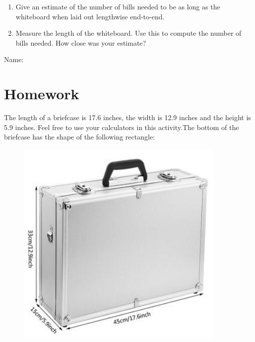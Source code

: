 \documentclass{article}
\begin{document}
\begin{enumerate}
  \vspace{1.5in}
  
\item Give an estimate of the number of bills needed to be as long as the whiteboard when laid out lengthwise end-to-end.

  \vspace{1.5in}
  
\item Measure the length of the whiteboard. Use this to compute the number of bills needed. How close was your estimate?
\end{enumerate}

\mynewpage

\hfill Name:\underline{\hspace{1.5in}}
\section*{Homework}
The length of a briefcase is 17.6 inches, the width is 12.9 inches and
the height is 5.9 inches.  Feel free to use your calculators in this
activity.The bottom of the briefcase has the shape of the following
rectangle:

\begin{figure}[h!]
  \centering
  \begin{minipage}{0.5\textwidth}
  \end{minipage}
  \begin{minipage}{0.4\textwidth}
    \includegraphics[width=0.9\textwidth]{briefcase.png} 
  \end{minipage}
\end{figure}
\end{document}
